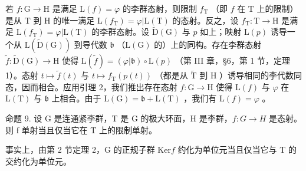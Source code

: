 若 \(f: \mathrm{G} \to \mathrm{H}\) 是满足 \(\mathrm{L}(f) = \varphi\) 的李群态射，则限制 \(f_{\mathrm{T}}\) （即 \(f\) 在 \(\mathrm{T}\) 上的限制）是从 \(\mathrm{T}\) 到 \(\mathrm{H}\) 的唯一满足 \(\mathrm{L}(f_{\mathrm{T}}) = \varphi | \mathrm{L}(\mathrm{T})\) 的态射。反之，设 \(f_{\mathrm{T}}: \mathrm{T} \to \mathrm{H}\) 是满足 \(\mathrm{L}(f_{\mathrm{T}}) = \varphi | \mathrm{L}(\mathrm{T})\) 的李群态射。设 \(\tilde{\mathrm{D}}(\mathrm{G})\) 与 \(p\) 如上；映射 \(\mathrm{L}(p)\) 诱导一个从 \(\mathrm{L}(\tilde{\mathrm{D}}(\mathrm{G}))\) 到导代数 \(\mathfrak{b}\) （\(\mathrm{L}(\mathrm{G})\) 的）上的同构。存在李群态射 \(\tilde{f}: \tilde{\mathrm{D}}(\mathrm{G}) \to \mathrm{H}\) 使得 \(\mathrm{L}(\tilde{f}) = (\varphi | \mathfrak{b}) \circ \mathrm{L}(p)\) （第 III 章，§6，第 1 节，定理 1）。态射 \(t \mapsto \tilde{f}(t)\) 与 \(t \mapsto f_{\mathrm{T}}(p(t))\) （都是从 \(\tilde{\mathrm{T}}\) 到 \(\mathrm{H}\) ）诱导相同的李代数同态，因而相合。应用引理 2，我们推出存在态射 \(f: \mathrm{G} \to \mathrm{H}\) 使得 \(\mathrm{L}(f)\) 与 \(\varphi\) 在 \(\mathrm{L}(\mathrm{T})\) 与 \(\mathfrak{b}\) 上相合。由于 \(\mathrm{L}(\mathrm{G}) = \mathfrak{b} + \mathrm{L}(\mathrm{T})\) ，我们有 \(\mathrm{L}(f) = \varphi\) 。

命题 9. 设 G 是连通紧李群，T 是 G 的极大环面，H 是李群，\(f: G \to H\) 是态射。则 f 单射当且仅当它在 T 上的限制单射。

事实上，由第 2 节定理 2，G 的正规子群 \(\mathrm{Ker}f\) 约化为单位元当且仅当它与 T 的交约化为单位元。

